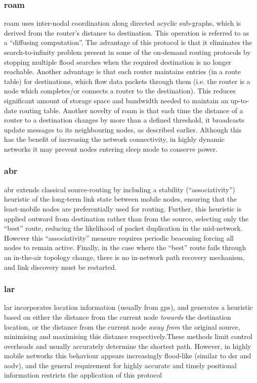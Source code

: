 \subsubsection{\gls{roam}}
\gls{roam} uses inter-nodal coordination along directed acyclic sub-graphs, which is derived from the router’s distance to destination. This operation is referred to as a “diffusing computation”. The advantage of this protocol is that it eliminates the search-to-infinity problem present in some of the on-demand routing protocols by stopping multiple flood searches when the required destination is no longer reachable. Another advantage is that each router maintains entries (in a route table) for destinations, which flow data packets through them (i.e. the router is a node which completes/or connects a router to the destination). This reduces significant amount of storage space and bandwidth needed to maintain an up-to-date routing table. Another novelty of \gls{roam} is that each time the distance of a router to a destination changes by more than a defined threshold, it broadcasts update messages to its neighbouring nodes, as described earlier. Although this has the benefit of increasing the network connectivity, in highly dynamic networks it may prevent nodes entering sleep mode to conserve power.\\ %
\subsubsection{\gls{abr}}
\gls{abr} extends classical source-routing by including a stability (``associativity'') heuristic of the long-term link state between mobile nodes, ensuring that the least-mobile nodes are preferentially used for routing. Further, this heuristic is applied outward from destination rather than from the source, selecting only the ``best'' route, reducing the likelihood of packet duplication in the mid-network. However this ``associativity'' measure requires periodic beaconing forcing all nodes to remain active. Finally, in the case where the ``best'' route fails through an in-the-air topology change, there is no in-network path recovery mechanism, and link discovery must be restarted\cite{Toh1997}.\\
\subsubsection{\gls{lar}}
\gls{lar} incorporates location information (usually from \gls{gps}), and generates a heuristic based on either the distance from the current node \emph{towards} the destination location, or the distance from the current node \emph{away from} the original source, minimising and maximising this distance respectively.These methods limit control overheads and usually accurately determine the shortest path. However, in highly mobile networks this behaviour appears increasingly flood-like (similar to \gls{dsr} and \gls{aodv}), and the general requirement for highly accurate and timely positional information restricts the application of this protocol\\
